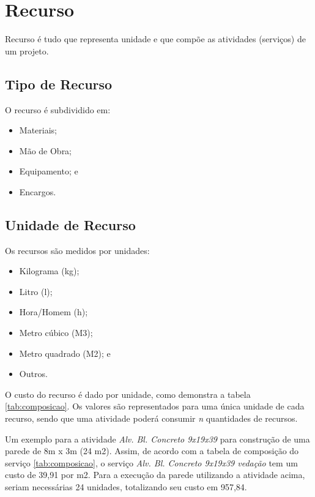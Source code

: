 \chapter{Recurso}

Recurso é tudo que representa unidade e que compõe as atividades (serviços) de um projeto. 

\section{Tipo de Recurso}

O recurso é subdividido em: 

\begin{itemize}
	\item Materiais;
	\item Mão de Obra;
	\item Equipamento; e
	\item Encargos.
\end{itemize}

\section{Unidade de Recurso}

Os recursos são medidos por unidades:

\begin{itemize}
	\item Kilograma (kg);
	\item Litro (l);
	\item Hora/Homem (h);
	\item Metro cúbico (M3);
	\item Metro quadrado (M2); e
	\item Outros.
\end{itemize}

O custo do recurso é dado por unidade, como demonstra a tabela \ref{tab:composicao}. Os valores são representados para uma única unidade de cada recurso, sendo que uma atividade poderá consumir \emph{n} quantidades de recursos.

Um exemplo para a atividade \emph{Alv. Bl. Concreto 9x19x39} para construção de uma parede de 8m x 3m (24 m2). Assim, de acordo com a tabela de composição do serviço \ref{tab:composicao}, o serviço \emph{Alv. Bl. Concreto 9x19x39 vedação} tem um custo de 39,91 por m2. Para a execução da parede utilizando a atividade acima, seriam necessárias 24 unidades, totalizando seu custo em 957,84.